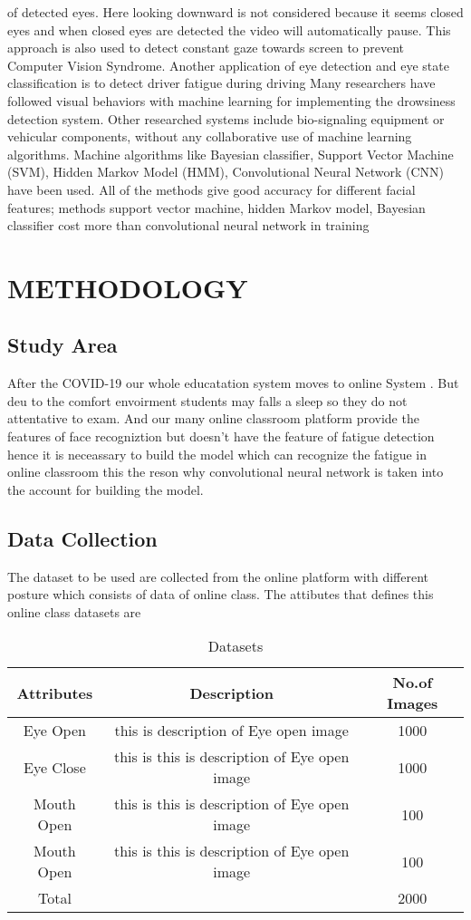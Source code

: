 \documentclass[a4paper,12pt]{report}
\begin{document}
of detected eyes. Here looking downward is not considered because it seems closed eyes 
and when closed eyes are detected the video will automatically pause. This approach is 
also used to detect constant gaze towards screen to prevent Computer Vision Syndrome. 
Another application of eye detection and eye state classification is to detect driver fatigue 
during driving
\newline
\newline
Many researchers have followed visual behaviors with machine learning for implementing 
the drowsiness detection system. Other researched systems include bio-signaling
equipment or vehicular components, without any collaborative use of machine learning 
algorithms. Machine algorithms like Bayesian classifier, Support Vector Machine (SVM), 
Hidden Markov Model (HMM), Convolutional Neural Network (CNN) have been used. 
All of the methods give good accuracy for different facial features; methods support vector 
machine, hidden Markov model, Bayesian classifier cost more than convolutional neural 
network in training

\chapter{METHODOLOGY}
\section{Study Area}
After the COVID-19 our whole educatation system moves to online System . But deu to the comfort envoirment students may falls a sleep so they do not attentative to exam.  And our many online classroom platform provide the features of face recogniztion but doesn't have the feature of fatigue detection hence it is neceassary to build the model which can recognize the fatigue in online classroom this the reson why convolutional neural network is taken into the account for building the model. 
\section{Data Collection}
The dataset to be used are collected from the  online platform with different posture which consists of data of online class. The attibutes that defines this online class datasets are 
	\begin{table}
	\centering
	\caption{Datasets}
	\begin{tabular}{ | c |  c | c | }
		\toprule
		\textbf{Attributes} & \textbf{Description} & \textbf{No.of Images} \\
		\midrule
		Eye Open & this is description  of  Eye open image & 1000 \\
		Eye Close & this is this is description  of  Eye open image & 1000 \\
		Mouth Open &  this is this is description  of  Eye open image & 100 \\
		Mouth Open &  this is this is description  of  Eye open image & 100\\
		\bottomrule
		Total & & 2000
	\end{tabular}
\end{table}


\end{document}
